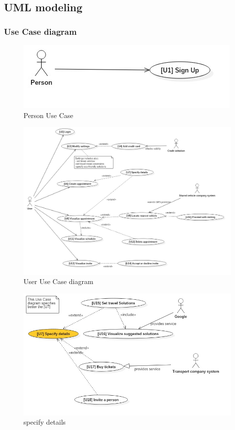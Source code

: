 \subsection{UML modeling}
	\subsubsection{Use Case diagram}
		\smallskip
		\begin{figure}[H]	
			\centerline{\includegraphics[scale= 0.7]{Images/UseCaseDiagram0}}
			\caption{Person Use Case}
		\end{figure}
		\begin{figure}[H]	
			\centerline{\includegraphics[width=\paperwidth-1]{Images/UseCaseDiagram1}}
			\caption{User Use Case diagram}
		\end{figure}

	\begin{figure}[H]	
	\centerline{\includegraphics[width=\paperwidth-1]{Images/UseCaseDiagram2}}
	\caption{ specify details }
\end{figure}


